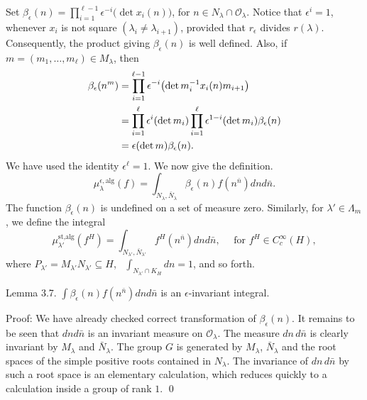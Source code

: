 \documentclass{amsart}
\begin{document}
\noindent
Set
  $ \beta_{\epsilon} (n) =  
    \prod_{i=1}^{\ell-1} \epsilon^{-i} 
    \bigl(
       \det x_i (n)
    \bigr) $, for $n\in N_\lambda\cap{\mathcal O}_\lambda$.
Notice that $ \epsilon^i = 1 $,
whenever
  $ x_i $
is not square
  $ (\lambda_i \neq \lambda_{i+1} ) $, provided that
  $r_\epsilon$ divides $r(\lambda)$.
Consequently, the product giving
  $ \beta_{\epsilon} (n) $
is well defined.
Also, if
  $ m =
     (m_1, \dots, m_{\ell}) \in M_{\lambda} $,
then
%
\begin{align*}
\beta_{\epsilon} (n^m) &=
    \prod_{i=1}^{\ell-1} 
    \epsilon^{-i}
    \bigl(
      \det 
         m_i^{-1} 
            x_i (n)
            m_{i+1}
     \bigr)
\\
\vspace{4pt}
&=
    \prod_{i=1}^{\ell} 
    \epsilon^i
    (\det m_i)
    \prod_{i=1}^{\ell} 
    \epsilon^{1-i} 
    (\det m_i) 
    \beta_{\epsilon} (n)
\\
\vspace{4pt}
&=
   \epsilon
   (\det m)
   \beta_{\epsilon} (n).
\end{align*}
%
   We have used the identity $\epsilon^{\ell} = 1 $.
\noindent
We now give the definition.
%
$$
  \mu_{\lambda}^{\epsilon,\text{alg}}
  (f) =
  \int_{N_{\lambda},\bar N_{\lambda}}
  \beta_{\epsilon} (n) 
  f (n^{\bar n}) d nd \bar n.
$$
%
The function $\beta_{\epsilon} (n) $ is undefined on 
a set of measure zero.
Similarly, for $ \lambda' \in \Lambda_m $,
we define the integral
%
$$
  \mu_{\lambda'}^{\text{st}, \text{alg}}
  (f^H) =
  \int_{ N_{\lambda'}, \bar N_{\lambda'} }
  f^H(n^{\bar n}) d n d \bar n, \quad \text{ for }f^H\in C_c^\infty(H),
$$
%
where
  $ P_{\lambda'} = 
    M_{\lambda'} 
    N_{\lambda'} 
    \subseteq
    H$, \ 
    $\int_{N_{\lambda'}\cap K_H}
    d n = 1 $, and so forth.

\proclaim Lemma {3.7}.
  $ \int
    \beta_{\epsilon} (n) f 
    (n^{\bar n}) 
    d n d \bar n $
is an 
  $ \epsilon$-invariant integral.
\finishproclaim

\pproclaim  Proof:
We have already checked correct transformation of
  $ \beta_{\epsilon} (n) $.
It remains to be seen that
  $ d n d \bar n$
is an invariant measure on
  $ {\mathcal O}_{\lambda} $.
The measure $dn\,d\bar n$ is clearly invariant
by $M_\lambda$ and $\bar N_\lambda$.  The group
$G$ is generated by $M_\lambda$, $\bar N_\lambda$ and
the root spaces of the simple positive roots contained
in $N_\lambda$.  The invariance of $dn\,d\bar n$
by such a root space is an elementary calculation,
which reduces quickly to a calculation inside a group of rank $1$.
\qed
\finishpproclaim
\end{document}
